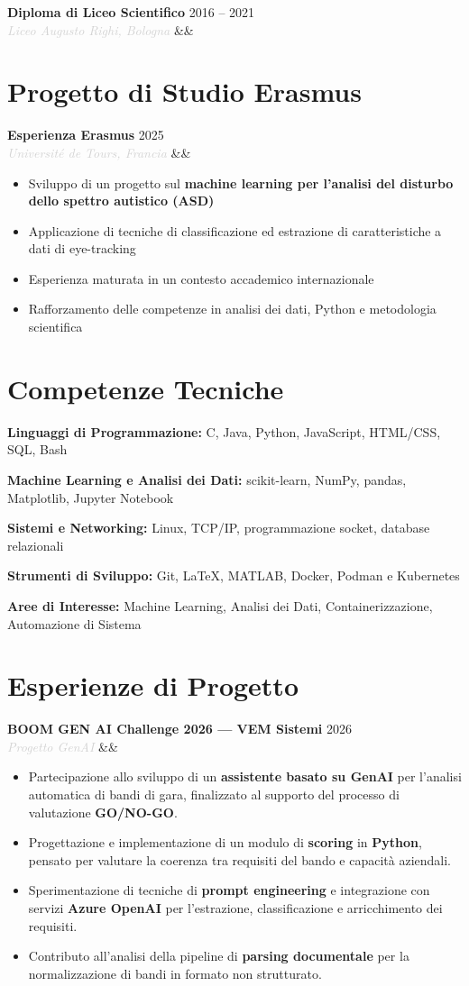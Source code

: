 \documentclass[a4paper,10pt]{article}
\newcommand{\entry}[4]{%
  \noindent\textbf{#1} \hfill \textcolor{accent}{#2}\\
  \textit{\textcolor{lightgray}{#3}}%
  \ifx&#4&\else\\\vspace{0.2em}#4\fi
  \vspace{0.5em}
}
\newcommand{\entrylist}[5]{%
  \noindent\textbf{#1} \hfill \textcolor{accent}{#2}\\
  \textit{\textcolor{lightgray}{#3}}%
  \ifx&#4&\else\\\vspace{0.2em}#4\fi
  \vspace{0.3em}
  \begin{itemize}#5\end{itemize}
  \vspace{0.3em}
}
\newcommand{\skillgroup}[2]{%
  \noindent\textbf{#1:} #2\par\vspace{0.35em}
}
\begin{document}
\entry{Diploma di Liceo Scientifico}{2016 -- 2021}{Liceo Augusto Righi, Bologna}{}

\section{Progetto di Studio Erasmus}

\entrylist{Esperienza Erasmus}{2025}{Université de Tours, Francia}{}{
  \item Sviluppo di un progetto sul \textbf{machine learning per l’analisi del disturbo dello spettro autistico (ASD)}
  \item Applicazione di tecniche di classificazione ed estrazione di caratteristiche a dati di eye-tracking
  \item Esperienza maturata in un contesto accademico internazionale
  \item Rafforzamento delle competenze in analisi dei dati, Python e metodologia scientifica
}

\section{Competenze Tecniche}

\skillgroup{Linguaggi di Programmazione}{C, Java, Python, JavaScript, HTML/CSS, SQL, Bash}
\skillgroup{Machine Learning e Analisi dei Dati}{scikit-learn, NumPy, pandas, Matplotlib, Jupyter Notebook}
\skillgroup{Sistemi e Networking}{Linux, TCP/IP, programmazione socket, database relazionali}
\skillgroup{Strumenti di Sviluppo}{Git, \LaTeX, MATLAB, Docker, Podman e Kubernetes}
\skillgroup{Aree di Interesse}{Machine Learning,
                               Analisi dei Dati,
                               Containerizzazione, Automazione di Sistema}

\section{Esperienze di Progetto}

\entrylist{BOOM GEN AI Challenge 2026 — VEM Sistemi}{2026}{Progetto GenAI}{}{
  \item Partecipazione allo sviluppo di un \textbf{assistente basato su GenAI} per l'analisi automatica di bandi di gara, finalizzato al supporto del processo di valutazione \textbf{GO/NO-GO}.
  \item Progettazione e implementazione di un modulo di \textbf{scoring} in \textbf{Python}, pensato per valutare la coerenza tra requisiti del bando e capacità aziendali.
  \item Sperimentazione di tecniche di \textbf{prompt engineering} e integrazione con servizi \textbf{Azure OpenAI} per l'estrazione, classificazione e arricchimento dei requisiti.
  \item Contributo all'analisi della pipeline di \textbf{parsing documentale} per la normalizzazione di bandi in formato non strutturato.
}
\end{document}
